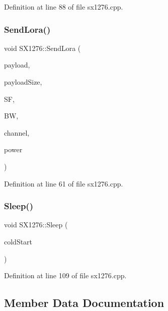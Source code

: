 Definition at line 88 of file sx1276.\+cpp.

\mbox{\label{class_s_x1276_a3c109223d212fb13d5eed45de23ccee6}} 
\subsubsection{\texorpdfstring{Send\+Lora()}{SendLora()}}
{\footnotesize\ttfamily void S\+X1276\+::\+Send\+Lora (\begin{DoxyParamCaption}\item[{uint8\+\_\+t $\ast$}]{payload,  }\item[{uint8\+\_\+t}]{payload\+Size,  }\item[{uint8\+\_\+t}]{SF,  }\item[{\mbox{\hyperlink{_define_8h_a6cbb491180e131f374cdbe63880c85e1}{e\+Band\+Width}}}]{BW,  }\item[{uint32\+\_\+t}]{channel,  }\item[{int8\+\_\+t}]{power }\end{DoxyParamCaption})}



Definition at line 61 of file sx1276.\+cpp.

\mbox{\label{class_s_x1276_a479a2ca97b17fd54224ad2fac9d84193}} 
\subsubsection{\texorpdfstring{Sleep()}{Sleep()}}
{\footnotesize\ttfamily void S\+X1276\+::\+Sleep (\begin{DoxyParamCaption}\item[{bool}]{cold\+Start }\end{DoxyParamCaption})}



Definition at line 109 of file sx1276.\+cpp.



\subsection{Member Data Documentation}
\mbox{\label{class_s_x1276_aa927ccaaf4ff0cec945f8e9f02171c00}} 
